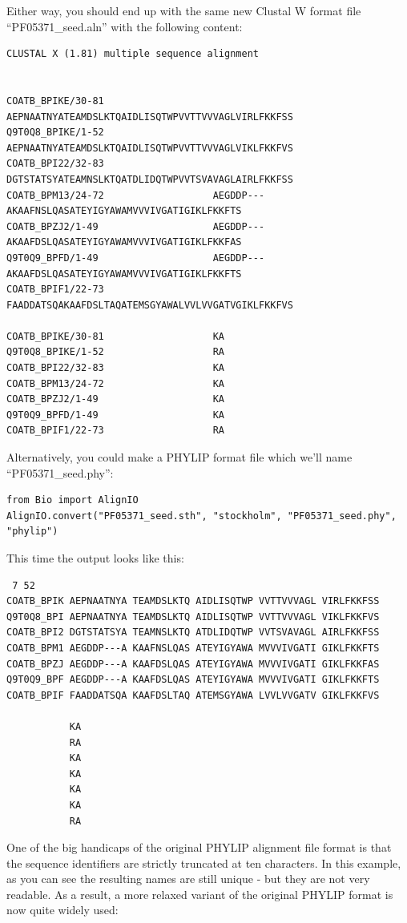 \documentclass{report}
\begin{document}
Either way, you should end up with the same new Clustal W format file ``PF05371\_seed.aln'' with the following content:

\begin{verbatim}
CLUSTAL X (1.81) multiple sequence alignment


COATB_BPIKE/30-81                   AEPNAATNYATEAMDSLKTQAIDLISQTWPVVTTVVVAGLVIRLFKKFSS
Q9T0Q8_BPIKE/1-52                   AEPNAATNYATEAMDSLKTQAIDLISQTWPVVTTVVVAGLVIKLFKKFVS
COATB_BPI22/32-83                   DGTSTATSYATEAMNSLKTQATDLIDQTWPVVTSVAVAGLAIRLFKKFSS
COATB_BPM13/24-72                   AEGDDP---AKAAFNSLQASATEYIGYAWAMVVVIVGATIGIKLFKKFTS
COATB_BPZJ2/1-49                    AEGDDP---AKAAFDSLQASATEYIGYAWAMVVVIVGATIGIKLFKKFAS
Q9T0Q9_BPFD/1-49                    AEGDDP---AKAAFDSLQASATEYIGYAWAMVVVIVGATIGIKLFKKFTS
COATB_BPIF1/22-73                   FAADDATSQAKAAFDSLTAQATEMSGYAWALVVLVVGATVGIKLFKKFVS

COATB_BPIKE/30-81                   KA
Q9T0Q8_BPIKE/1-52                   RA
COATB_BPI22/32-83                   KA
COATB_BPM13/24-72                   KA
COATB_BPZJ2/1-49                    KA
Q9T0Q9_BPFD/1-49                    KA
COATB_BPIF1/22-73                   RA
\end{verbatim}

Alternatively, you could make a PHYLIP format file which we'll name ``PF05371\_seed.phy'':

\begin{verbatim}
from Bio import AlignIO
AlignIO.convert("PF05371_seed.sth", "stockholm", "PF05371_seed.phy", "phylip")
\end{verbatim}

This time the output looks like this:

\begin{verbatim}
 7 52
COATB_BPIK AEPNAATNYA TEAMDSLKTQ AIDLISQTWP VVTTVVVAGL VIRLFKKFSS
Q9T0Q8_BPI AEPNAATNYA TEAMDSLKTQ AIDLISQTWP VVTTVVVAGL VIKLFKKFVS
COATB_BPI2 DGTSTATSYA TEAMNSLKTQ ATDLIDQTWP VVTSVAVAGL AIRLFKKFSS
COATB_BPM1 AEGDDP---A KAAFNSLQAS ATEYIGYAWA MVVVIVGATI GIKLFKKFTS
COATB_BPZJ AEGDDP---A KAAFDSLQAS ATEYIGYAWA MVVVIVGATI GIKLFKKFAS
Q9T0Q9_BPF AEGDDP---A KAAFDSLQAS ATEYIGYAWA MVVVIVGATI GIKLFKKFTS
COATB_BPIF FAADDATSQA KAAFDSLTAQ ATEMSGYAWA LVVLVVGATV GIKLFKKFVS

           KA
           RA
           KA
           KA
           KA
           KA
           RA
\end{verbatim}

One of the big handicaps of the original PHYLIP alignment file format is
that the sequence identifiers are strictly truncated at ten characters.
In this example, as you can see the resulting names are still unique -
but they are not very readable. As a result, a more relaxed variant of
the original PHYLIP format is now quite widely used:
\end{document}
